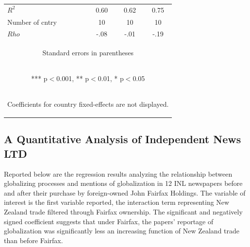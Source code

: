 \documentclass[12pt]{report}
\begin{document}
\begin{table}[htdp]
\begin{center}
{\begin{tabular}{lccc}
$R^2$ & 0.60 & 0.62 & 0.75 \\
Number of cntry & 10 & 10 & 10 \\
 $Rho$ & -.08 & -.01 & -.19 \\ \hline
\multicolumn{4}{c}{\begin{footnotesize} Standard errors in parentheses\end{footnotesize}} \\
\multicolumn{4}{c}{\begin{footnotesize} *** p$<$0.001, ** p$<$0.01, * p$<$0.05\end{footnotesize}} \\
\multicolumn{4}{c}{\begin{footnotesize} Coefficients for country fixed-effects are not displayed. \end{footnotesize}} \\
\end{tabular}
}
\end{center}
\label{default}
\end{table}

\pagebreak

\subsection{A Quantitative Analysis of Independent News LTD}
Reported below are the regression results analyzing the relationship between globalizing processes and mentions of globalization in 12 INL newspapers before and after their purchase by foreign-owned John Fairfax Holdings. The variable of interest is the first variable reported, the interaction term representing New Zealand trade filtered through Fairfax ownership. The significant and negatively signed coefficient suggests that under Fairfax, the papers' reportage of globalization was significantly less an increasing function of New Zealand trade than before Fairfax.
\end{document}
